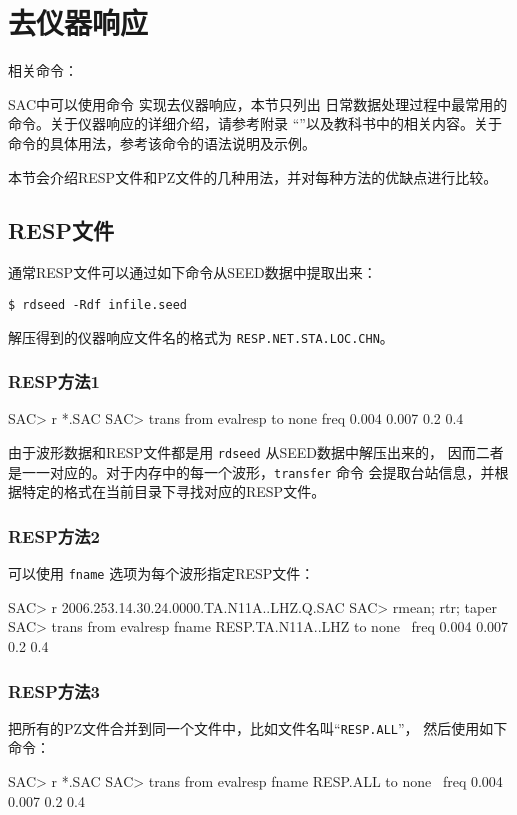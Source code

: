 \section{去仪器响应}
\label{sec:instrument-response}
相关命令：

SAC中可以使用命令  实现去仪器响应，本节只列出
日常数据处理过程中最常用的命令。关于仪器响应的详细介绍，请参考附录
``''以及教科书中的相关内容。关于  
命令的具体用法，参考该命令的语法说明及示例。

本节会介绍RESP文件和PZ文件的几种用法，并对每种方法的优缺点进行比较。
\subsection{RESP文件}
通常RESP文件可以通过如下命令从SEED数据中提取出来：
\begin{verbatim}
$ rdseed -Rdf infile.seed
\end{verbatim}
解压得到的仪器响应文件名的格式为 \texttt{RESP.NET.STA.LOC.CHN}。

\subsubsection{RESP方法1}
\begin{SACCode}
SAC> r *.SAC
SAC> trans from evalresp to none freq 0.004 0.007 0.2 0.4
\end{SACCode}
由于波形数据和RESP文件都是用 \texttt{rdseed} 从SEED数据中解压出来的，
因而二者是一一对应的。对于内存中的每一个波形，\texttt{transfer} 命令
会提取台站信息，并根据特定的格式在当前目录下寻找对应的RESP文件。

\subsubsection{RESP方法2}
可以使用 \texttt{fname} 选项为每个波形指定RESP文件：
\begin{SACCode}
SAC> r 2006.253.14.30.24.0000.TA.N11A..LHZ.Q.SAC
SAC> rmean; rtr; taper
SAC> trans from evalresp fname RESP.TA.N11A..LHZ to none \
                                freq 0.004 0.007 0.2 0.4
\end{SACCode}

\subsubsection{RESP方法3}
把所有的PZ文件合并到同一个文件中，比如文件名叫``\texttt{RESP.ALL}''，
然后使用如下命令：
\begin{SACCode}
SAC> r *.SAC
SAC> trans from evalresp fname RESP.ALL to none \
                            freq 0.004 0.007 0.2 0.4
\end{SACCode}

